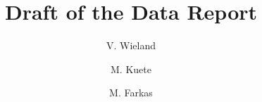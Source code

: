 \documentclass[3p,review,times]{elsarticle}		%
\begin{document}
\begin{frontmatter}





\title{Draft of the Data Report} %


\author[vw]{V. Wieland }

\author[vw]{M. Kuete }
\author[vw]{M. Farkas }



\address[vw]{IMFS, Goethe University Frankfurt, House of Finance, Theodor-W.-Adorno Platz 3, 60629 Frankfurt am Main, Germany}







\end{frontmatter}
\end{document}
